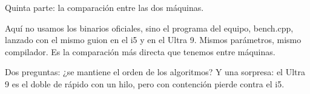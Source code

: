 Quinta parte: la comparación entre las dos máquinas.

Aquí no usamos los binarios oficiales, sino el programa del equipo, bench.cpp, lanzado con el mismo guion en el i5 y en el Ultra 9. Mismos parámetros, mismo compilador. Es la comparación más directa que tenemos entre máquinas.

Dos preguntas: ¿se mantiene el orden de los algoritmos? Y una sorpresa: el Ultra 9 es el doble de rápido con un hilo, pero con contención pierde contra el i5.
